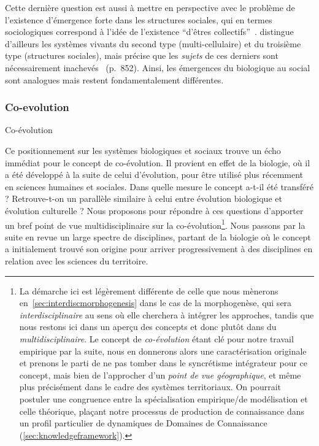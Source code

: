 Cette dernière question est aussi à mettre en perspective avec le problème de l'existence d'émergence forte dans les structures sociales, qui en termes sociologiques correspond à l'idée de l'existence ``d'êtres collectifs''~\cite{angeletti2015etres}.  distingue d'ailleurs les systèmes vivants du second type (multi-cellulaire) et du troisième type (structures sociales), mais précise que les \emph{sujets} de ces derniers sont nécessairement inachevés~\cite{morin1980methode} (p.~852). Ainsi, les émergences du biologique au social sont analogues mais restent fondamentalement différentes.



\subsubsection{Co-evolution}{Co-évolution}


Ce positionnement sur les systèmes biologiques et sociaux trouve un écho immédiat pour le concept de co-évolution. Il provient en effet de la biologie, où il a été développé à la suite de celui d'évolution, pour être utilisé plus récemment en sciences humaines et sociales. Dans quelle mesure le concept a-t-il été transféré ? Retrouve-t-on un parallèle similaire à celui entre évolution biologique et évolution culturelle ? Nous proposons pour répondre à ces questions d'apporter un bref point de vue multidisciplinaire sur la co-évolution\footnote{La démarche ici est légèrement différente de celle que nous mènerons en~\ref{sec:interdiscmorphogenesis} dans le cas de la morphogenèse, qui sera \emph{interdisciplinaire} au sens où elle cherchera à intégrer les approches, tandis que nous restons ici dans un aperçu des concepts et donc plutôt dans du \emph{multidisciplinaire}. Le concept de \emph{co-évolution} étant clé pour notre travail empirique par la suite, nous en donnerons alors une caractérisation originale et prenons le parti de ne pas tomber dans le syncrétisme intégrateur pour ce concept, mais bien de l'approcher d'un \emph{point de vue géographique}, et même plus précisément dans le cadre des systèmes territoriaux. On pourrait postuler une congruence entre la spécialisation empirique/de modélisation et celle théorique, plaçant notre processus de production de connaissance dans un profil particulier de dynamiques de Domaines de Connaissance (\ref{sec:knowledgeframework}).}. Nous passons par la suite en revue un large spectre de disciplines, partant de la biologie où le concept a initialement trouvé son origine pour arriver progressivement à des disciplines en relation avec les sciences du territoire.




